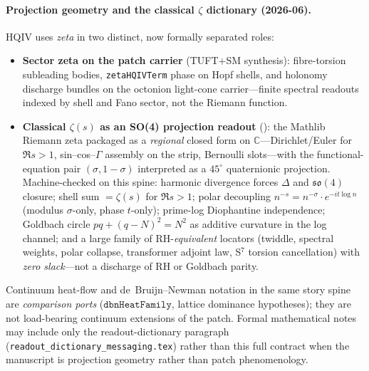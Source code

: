 \paragraph{Projection geometry and the classical $\zeta$ dictionary (2026-06).}
HQIV uses \emph{zeta} in two distinct, now formally separated roles:
\begin{itemize}[nosep]
\item \textbf{Sector zeta on the patch carrier} (TUFT+SM synthesis): fibre-torsion
subleading bodies, \texttt{zetaHQIVTerm} phase on Hopf shells, and holonomy
discharge bundles on the octonion light-cone carrier---finite spectral readouts
indexed by shell and Fano sector, not the Riemann function.
\item \textbf{Classical $\zeta(s)$ as an SO(4) projection readout}
(\cite{hqiv-s3-zeta-so4-paper}): the Mathlib Riemann zeta packaged as a
\emph{regional} closed form on $\mathbb{C}$---Dirichlet/Euler for $\Re s>1$,
sin--cos--$\Gamma$ assembly on the strip, Bernoulli slots---with the
functional-equation pair $(\sigma,1-\sigma)$ interpreted as a $45^\circ$
quaternionic projection.  Machine-checked on this spine: harmonic divergence
forces $\Delta$ and $\mathfrak{so}(4)$ closure; shell sum $=\zeta(s)$ for
$\Re s>1$; polar decoupling $n^{-s}=n^{-\sigma}\cdot e^{-it\log n}$ (modulus
$\sigma$-only, phase $t$-only); prime-log Diophantine independence; Goldbach
circle $pq+(q-N)^2=N^2$ as additive curvature in the log channel; and a large
family of RH-\emph{equivalent} locators (twiddle, spectral weights, polar
collapse, transformer adjoint law, S$^7$ torsion cancellation) with
\emph{zero slack}---not a discharge of RH or Goldbach parity.
\end{itemize}
Continuum heat-flow and de~Bruijn--Newman notation in the same story spine are
\emph{comparison ports} ($\texttt{dbnHeatFamily}$, lattice dominance hypotheses);
they are not load-bearing continuum extensions of the patch.  Formal mathematical
notes may include only the readout-dictionary paragraph
(\texttt{readout\_dictionary\_messaging.tex}) rather than this full contract when
the manuscript is projection geometry rather than patch phenomenology.
\fi
\fi
